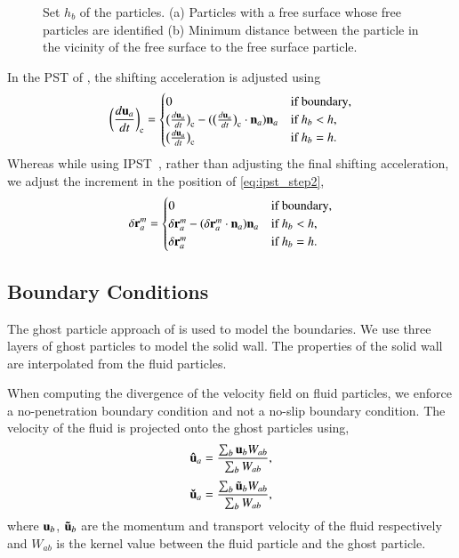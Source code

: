 \begin{figure}
\begin{subfigure}{0.1\textwidth}
    \subcaption{}%
    \label{fig:pst_free_surf_zoomed}
  \end{subfigure}
  \caption{
    Set $h_b$ of the particles. (a) Particles with a free surface whose
    free particles are identified (b) Minimum distance between the particle in
    the vicinity of the free surface to the free surface particle.}
\label{fig:pst_free_surf}
\end{figure}
%


In the PST of \cite{sun_consistent_2019}, the shifting acceleration is
adjusted using
\begin{equation}
 \label{eq:shifting_force_free_surface_adjust_sun2019}
 \bigg(\frac{d \mathbf{u}_a}{dt}\bigg)_{\text{c}} =\begin{cases}
   0& \text{if boundary},\\
   \big(\frac{d \mathbf{u}_a}{dt}\big)_{\text{c}}  - (\big(\frac{d \mathbf{u}_a}{dt}\big)_{\text{c}} \cdot \mathbf{n}_a) \mathbf{n}_a& \text{if $h_b < h$},\\
   \big(\frac{d \mathbf{u}_a}{dt}\big)_{\text{c}}& \text{if $h_b = h$}.
 \end{cases}
\end{equation}
Whereas while using IPST~\citep{huang_kernel_2019}, rather than adjusting the
final shifting acceleration, we adjust the increment in the position of
\cref{eq:ipst_step2},
\begin{equation}
 \label{eq:shifting_force_free_surface_adjust_ipst}
 \delta \mathbf{r}_a^{m} =\begin{cases}
   0& \text{if boundary},\\
   \delta \mathbf{r}_a^{m} - (\delta \mathbf{r}_a^{m}  \cdot \mathbf{n}_a) \mathbf{n}_a& \text{if $h_b < h$},\\
   \delta \mathbf{r}_a^{m}& \text{if $h_b = h$}.
 \end{cases}
\end{equation}

\subsection{Boundary Conditions}

The ghost particle approach of \cite{Adami2012} is used to model the
boundaries. We use three layers of ghost particles to model the solid wall.
The properties of the solid wall are interpolated from the fluid particles.

When computing the divergence of the velocity field on fluid particles, we
enforce a no-penetration boundary condition and not a no-slip boundary
condition. The velocity of the fluid is projected onto the ghost particles
using,
\begin{equation}
  \label{eq:v-ghost}
  \mathbf{\hat{u}}_a = \frac{\sum_b\mathbf{u}_b W_{ab}}{\sum_b W_{ab}},
\end{equation}
\begin{equation}
  \label{eq:v-hat-ghost}
  \mathbf{\check{u}}_a = \frac{\sum_b\tilde{\mathbf{u}}_b W_{ab}}{\sum_b W_{ab}},
\end{equation}
where $\mathbf{u}_b$, $\mathbf{\tilde{u}}_b$ are the momentum and transport velocity
of the fluid respectively and $W_{ab}$ is the kernel value between the fluid
particle and the ghost particle.

